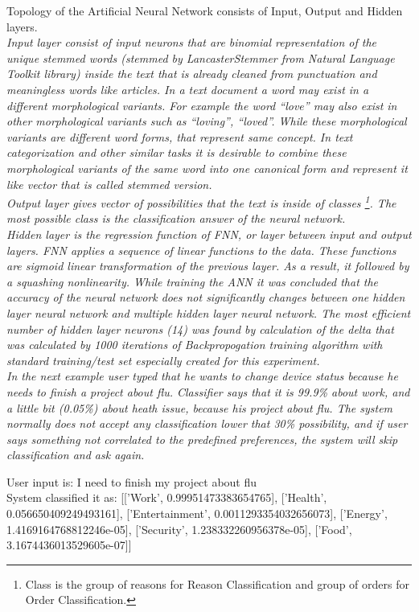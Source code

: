 \documentclass{llncs}
\begin{document}
    Topology of the Artificial Neural Network consists of Input, Output and Hidden layers.\\
    \em Input layer \em consist of input neurons that are binomial representation of the unique stemmed words (stemmed by LancasterStemmer from Natural Language Toolkit library) inside the text that is already cleaned from punctuation and meaningless words like articles.
    In a text document a word may exist in a different morphological variants.
    For example the word “love” may also exist in other morphological variants such as “loving”, “loved”.
    While these morphological variants are different word forms, that represent same concept.
    In text categorization and other similar tasks it is desirable to combine these morphological variants of the same word into one canonical form and represent it like vector that is called stemmed version.\\
    \em Output layer \em gives vector of possibilities that the text is inside of classes \footnote{Class is the group of reasons for Reason Classification and group of orders for Order Classification.}.
    The most possible class is the classification answer of the neural network.\\
    \em Hidden layer \em is the regression function of FNN, or layer between input and output layers.
    FNN applies a sequence of linear functions to the data.
    These functions are sigmoid linear transformation of the previous layer.
    As a result, it followed by a squashing nonlinearity.
    While training the ANN it was concluded that the accuracy of the neural network does not significantly changes between one hidden layer neural network and multiple hidden layer neural network.
    The most efficient number of hidden layer neurons (14) was found by calculation of the delta that was calculated by
    1000 iterations of Backpropogation training algorithm with standard training/test set especially created for this experiment.\\
    In the next example user typed that he wants to change device status because he needs to finish a project about flu.
    Classifier says that it is 99.9\% about work, and a little bit (0.05\%) about heath issue, because his project about flu.
    The system normally does not accept any classification lower that 30\% possibility, and if user says something not
    correlated to the predefined preferences, the system will skip classification and ask again.\\
    \begin{example}
        User input is: I need to finish my project about flu\\
        System classified it as: [['Work', 0.99951473383654765], ['Health', 0.056650409249493161], ['Entertainment', 0.0011293354032656073], ['Energy', 1.4169164768812246e-05], ['Security', 1.238332260956378e-05], ['Food', 3.1674436013529605e-07]]
    \end{example}
\end{document}
